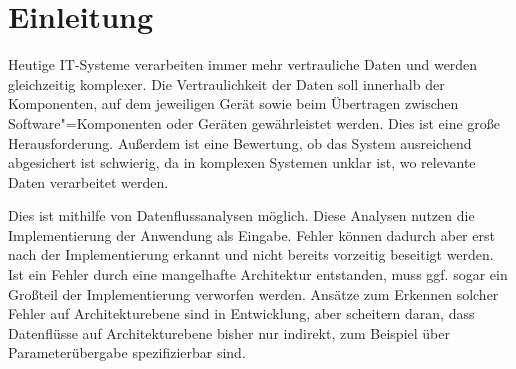 
\chapter{Einleitung}
\label{ch:Einleitung}
Heutige IT-Systeme verarbeiten immer mehr vertrauliche Daten und werden gleichzeitig komplexer. Die Vertraulichkeit der Daten soll innerhalb der Komponenten, auf dem jeweiligen Gerät sowie beim Übertragen zwischen Software"=Komponenten oder Geräten gewährleistet werden. Dies ist eine große Herausforderung. Außerdem ist eine Bewertung, ob das System ausreichend abgesichert ist schwierig, da in komplexen Systemen unklar ist, wo relevante Daten verarbeitet werden. \par
Dies ist mithilfe von Datenflussanalysen möglich. Diese Analysen nutzen die Implementierung der Anwendung als Eingabe. Fehler können dadurch aber erst nach der Implementierung erkannt und nicht bereits vorzeitig beseitigt werden. Ist ein Fehler durch eine mangelhafte Architektur entstanden, muss ggf. sogar ein Großteil der Implementierung verworfen werden. Ansätze zum Erkennen solcher Fehler auf Architekturebene sind in Entwicklung, aber scheitern daran, dass Datenflüsse auf Architekturebene bisher nur indirekt, zum Beispiel über Parameterübergabe spezifizierbar sind. \\


